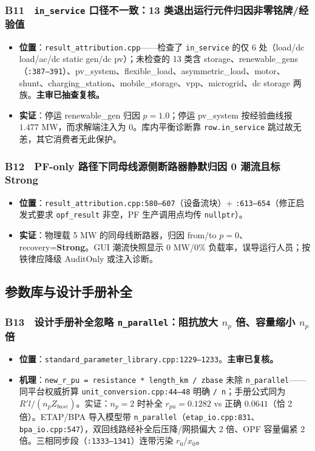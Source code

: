 \documentclass[11pt,a4paper,fontset=fandol]{ctexart}
\newcommand{\file}[1]{\texttt{#1}}
\begin{document}
\subsubsection*{B11　\texttt{in\_service} 口径不一致：13 类退出运行元件归因非零铭牌/经验值}
\begin{itemize}
  \item \textbf{位置}：\file{result\_attribution.cpp}——检查了 \texttt{in\_service} 的仅 6 处（load/dc load/ac/dc static gen/dc pv）；未检查的 13 类含 storage、renewable\_gens（\file{:387--391}）、pv\_system、flexible\_load、asymmetric\_load、motor、shunt、charging\_station、mobile\_storage、vpp、microgrid、dc storage 两族。\textbf{主审已抽查复核。}
  \item \textbf{实证}：停运 renewable\_gen 归因 $p=1.0$；停运 pv\_system 按经验曲线报 $1.477$ MW，而求解端注入为 0。库内平衡诊断靠 \texttt{row.in\_service} 跳过故无恙，其它消费者无此保护。
\end{itemize}

\subsubsection*{B12　PF-only 路径下同母线源侧断路器静默归因 0 潮流且标 Strong}
\begin{itemize}
  \item \textbf{位置}：\file{result\_attribution.cpp:580--607}（设备流块）$+$ \file{:613--654}（修正启发式要求 \texttt{opf\_result} 非空，PF 生产调用点均传 \texttt{nullptr}）。
  \item \textbf{实证}：物理载 5 MW 的同母线断路器，归因 from/to $p=0$、recovery=\textbf{Strong}。GUI 潮流快照显示 0 MW/0\% 负载率，误导运行人员；按铁律应降级 AuditOnly 或注入诊断。
\end{itemize}

\subsection{参数库与设计手册补全}

\subsubsection*{B13　设计手册补全忽略 \texttt{n\_parallel}：阻抗放大 $n_p$ 倍、容量缩小 $n_p$ 倍}
\begin{itemize}
  \item \textbf{位置}：\file{standard\_parameter\_library.cpp:1229--1233}。\textbf{主审已复核。}
  \item \textbf{机理}：\texttt{new\_r\_pu = resistance * length\_km / zbase} 未除 \texttt{n\_parallel}——同平台权威折算 \file{unit\_conversion.cpp:44--48} 明确 \texttt{/ n}；手册公式同为 $R'l/(n_p Z_{base})$。实证：$n_p=2$ 时补全 $r_{pu}=0.1282$ vs 正确 $0.0641$（恰 2 倍）。ETAP/BPA 导入模型带 \texttt{n\_parallel}（\file{etap\_io.cpp:831}、\file{bpa\_io.cpp:547}），双回线路经补全后压降/网损偏大 2 倍、OPF 容量偏紧 2 倍。三相同步段（\file{:1333--1341}）连带污染 $r_0/x_0$。
\end{itemize}
\end{document}

